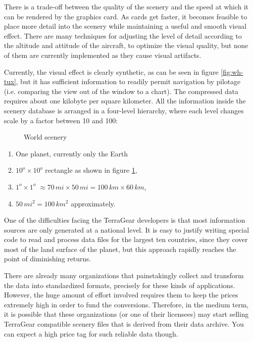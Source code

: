 \documentclass[a4paper,10pt]{article}
\begin{document}
%
There is a trade-off between the quality of the scenery and the speed
at which it can be rendered by the graphics card.  As cards get faster,
it becomes feasible to place more detail into the scenery while maintaining
a useful and smooth visual effect.
There are many techniques for adjusting the level of detail according to
the altitude and attitude of the aircraft, to optimize the visual quality,
but none of them are currently implemented as they cause visual artifacts.

Currently, the visual effect is clearly
synthetic, as can be seen in figure \ref{fig:wh-tux}, 
but it has sufficient information to readily permit navigation by
pilotage (i.e. comparing the view out of the window to a chart).
The compressed data requires about one kilobyte per square kilometer.
All the information inside the scenery database is arranged in a
four-level hierarchy,
where each level changes scale by a factor between 10 and 100:

\begin{figure}
\begin{center}\end{center}
\caption{World scenery}
\label{fig:theworld}
\end{figure}
%
\begin{enumerate}
\item One planet, currently only the Earth
\item $10^o\times10^o$ rectangle as shown in figure \ref{fig:theworld},
\item $1^o\times1^o$
	$\approx 70\,mi \times 50\,mi=100\,km \times 60\,km $,
\item $50 \, mi^2 = 100\,km^2 $ approximately.
\end{enumerate}


One of the difficulties facing the TerraGear developers is that most
information sources are only generated at a national level.  It is easy
to justify writing special code to read and process data files for the
largest ten countries, since they cover most of the land surface of the
planet, but this approach rapidly reaches the point of diminishing returns.

There are already many organizations that painstakingly collect and
transform the data into standardized formats, precisely for these kinds
of applications.  However, the huge amount of effort involved requires
them to keep the prices extremely high in order to fund the conversions.
Therefore, in the medium term, it is possible that these organizations
(or one of their licensees) may start selling TerraGear compatible scenery
files that is derived from their data archive.
You can expect a high price tag for such reliable data though.
\end{document}
